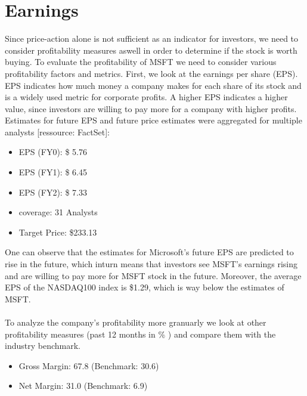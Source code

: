 \documentclass[]{article}
\begin{document}
\section{Earnings}
\noindent Since price-action alone is not sufficient as an indicator for investors, we need to consider profitability measures aswell in order to determine if the stock is worth buying. To evaluate the profitability of MSFT we need to consider various profitability factors and metrics. First, we look at the earnings per share (EPS). EPS indicates how much money a company makes for each share of its stock and is a widely used metric for corporate profits. A higher EPS indicates a higher value, since investors are willing to pay more for a company with higher profits.\cite{chen_2020}
Estimates for future EPS and future price estimates were aggregated for multiple analysts [ressource: FactSet]:
\begin{itemize}
\item EPS (FY0): \$ 5.76
\item EPS (FY1): \$ 6.45
\item EPS (FY2): \$ 7.33
\item coverage: 31 Analysts
\item Target Price: \$233.13
\end{itemize}
One can observe that the estimates for Microsoft's future EPS are predicted to rise in the future, which inturn means that investors see MSFT's earnings rising and are willing to pay more for MSFT stock in the future. Moreover, the average EPS of the NASDAQ100 index is \$1.29, which is way below the estimates of MSFT.\\\\
To analyze the company's profitability more granuarly we look at other profitability measures (past 12 months in \% ) and compare them with the industry benchmark.
\begin{itemize}
\item Gross Margin: 67.8 (Benchmark: 30.6)
\item Net Margin: 31.0 (Benchmark: 6.9)
\end{itemize}
\end{document}
